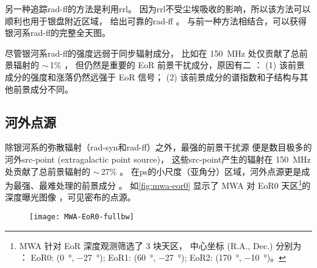 另一种追踪\ac{rad-ff}的方法是利用\ac{rrl}。
因为\ac{rrl}不受尘埃吸收的影响，所以该方法可以顺利也用于银盘附近区域，
给出可靠的\ac{rad-ff} \cite{alves2010,alves2012}。
与前一种方法相结合，可以获得银河系\ac{rad-ff}的完整全天图。

尽管银河系\ac{rad-ff}的强度远弱于同步辐射成分，
比如在 \SI{150}{\MHz} 处仅贡献了总前景辐射的 $\sim$\,1\% \cite{shaver1999}，
但仍然是重要的 EoR 前景干扰成分，原因有二 \cite{jelic2008}：
(1) 该前景成分的强度和涨落仍然远强于 EoR 信号；
(2) 该前景成分的谱指数和子结构与其他前景成分不同。

\subsection{河外点源}

除银河系的弥散辐射（\ac{rad-syn}和\ac{rad-ff}）之外，最强的前景干扰源
便是数目极多的河外\acs{src-point} (extragalactic point source)，
这些\ac{src-point}产生的辐射在 \SI{150}{\MHz} 处贡献了总前景辐射的
$\sim$\,27\% \cite{shaver1999}。
在\ac{ps}的小尺度（亚角分）区域，河外点源更是成为最强、最难处理的前景成分
\cite{murray2017,procopio2017,yoshiura2018}。
如\autoref{fig:mwa-eor0} 显示了 MWA 对 EoR0 天区\footnote{%
  MWA 针对 EoR 深度观测筛选了 3 块天区，
  中心坐标 (R.A., Dec.\@) 分别为 \cite{beardsley2016}：
  EoR0: (\SI{0}{\degree}, \SI{-27}{\degree});
  EoR1: (\SI{60}{\degree}, \SI{-27}{\degree});
  EoR2: (\SI{170}{\degree}, \SI{-10}{\degree})。
}的深度曝光图像 \cite{offringa2016}，可见密布的点源。

\begin{figure}[htp]
  \centering
  \texttt{[image: MWA-EoR0-fullbw]}
  \label{fig:mwa-eor0}
\end{figure}

